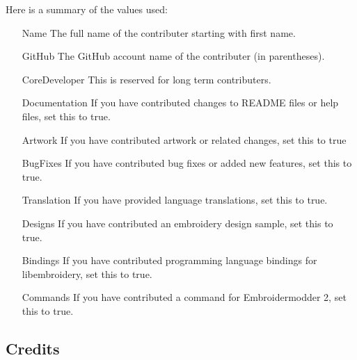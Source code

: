 \documentclass[onesize, a4paper]{refart}
\begin{document}
Here is a summary of the values used:
\begin{itemize}
\item[Name] The full name of the contributer starting with first name.
\item[GitHub] The GitHub account name of the contributer (in parentheses).
\item[CoreDeveloper] This is reserved for long term contributers.
\item[Documentation] If you have contributed changes to README files or help files, set this to true.
\item[Artwork] If you have contributed artwork or related changes, set this to true
\item[BugFixes] If you have contributed bug fixes or added new features, set this to true.
\item[Translation] If you have provided language translations, set this to true.
\item[Designs] If you have contributed an embroidery design sample, set this to true.
\item[Bindings] If you have contributed programming language bindings for libembroidery, set this to true.
\item[Commands] If you have contributed a command for Embroidermodder 2, set this to true.
\end{itemize}

\subsection{Credits}
\end{document}
